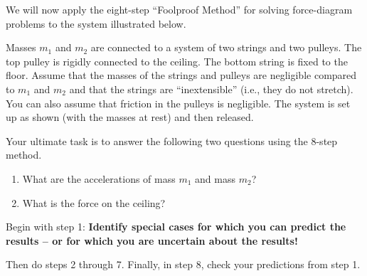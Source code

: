 \documentclass[11pt, letterpaper, openany]{book}
\newenvironment{exercise}[1][Exercise]{%
  \tcolorbox[blanker, breakable, left=1em,
    before skip=1em, after skip=1em,
    borderline west={3pt}{0pt}{PhysNavy},
    colback=PhysCream,
    before upper={\textcolor{PhysNavy}{\sffamily\bfseries #1:}\space}
  ]%
}{%
  \endtcolorbox%
}
\begin{document}
\begin{exercise}[Exercise 1: Two Masses \& Two Pulleys]
We will now apply the eight-step ``Foolproof Method'' for solving force-diagram problems to the system illustrated below.

Masses $m_1$ and $m_2$ are connected to a system of two strings and two pulleys. The top pulley is rigidly connected to the ceiling. The bottom string is fixed to the floor. Assume that the masses of the strings and pulleys are negligible compared to $m_1$ and $m_2$ and that the strings are ``inextensible'' (i.e., they do not stretch). You can also assume that friction in the pulleys is negligible. The system is set up as shown (with the masses at rest) and then released.

\begin{center}
\end{center}

Your ultimate task is to answer the following two questions using the 8-step method.
\begin{enumerate}[label=(\alph*)]
    \item What are the accelerations of mass $m_1$ and mass $m_2$?
    \item What is the force on the ceiling?
\end{enumerate}

Begin with step 1: \textbf{Identify special cases for which you can predict the results -- or for which you are uncertain about the results!}

Then do steps 2 through 7. Finally, in step 8, check your predictions from step 1.
\end{exercise}
\end{document}
